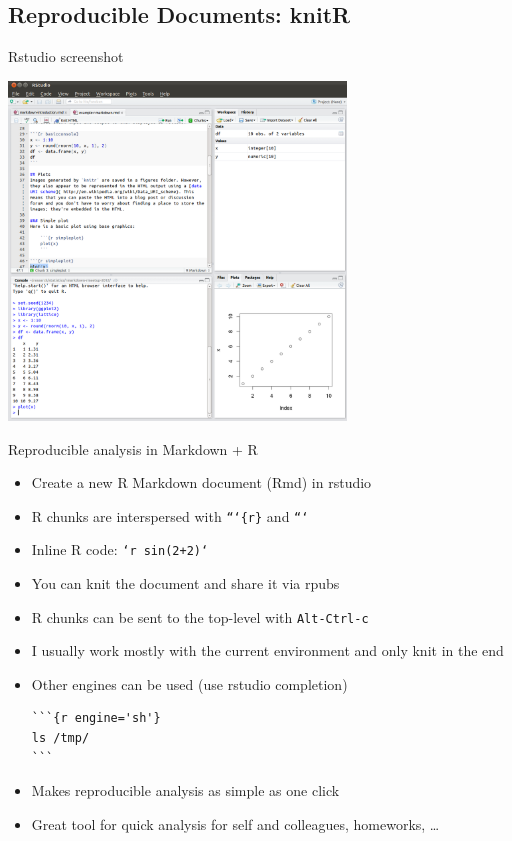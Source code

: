 \documentclass[11pt,xcolor=dvipsnames]{beamer}
\begin{document}
\subsection{Reproducible Documents: knitR}
\label{sec-4-2}
\begin{frame}[label=sec-4-2-1]{Rstudio screenshot}
\vspace{-.5cm}
\begin{center}
  \includegraphics[height=9cm]{./img/rstudio_shot.png}
\end{center}
\end{frame}
\begin{frame}[fragile,label=sec-4-2-2]{Reproducible analysis in Markdown + R}
 \begin{itemize}
\item Create a new \alert{R Markdown} document (Rmd) in rstudio
\item R chunks are interspersed with \texttt{```\{r\}} and \texttt{```}
\item Inline R code: \texttt{`r sin(2+2)`}
\item You can \alert{knit} the document and share it via \alert{rpubs}
\item R chunks can be sent to the top-level with \texttt{Alt-Ctrl-c}
\item I usually work mostly with the current environment and only knit in
the end
\item Other engines can be used (use rstudio \alert{completion})
\begin{verbatim}
```{r engine='sh'}
ls /tmp/
```
\end{verbatim}
\item Makes \alert{reproducible analysis as simple as one click}
\item Great tool for quick analysis for self and colleagues, homeworks, \ldots{}
\end{itemize}
\end{frame}


\end{document}

